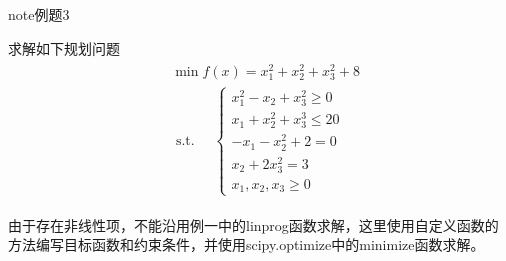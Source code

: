 \documentclass[letterpaper,10pt,english]{sphinxmanual}
\begin{document}
\begin{sphinxadmonition}{note}{例题3}

求解如下规划问题
\begin{equation*}
\begin{split}
\begin{array}{l}
&{\min f(x)=x_{1}^{2}+x_{2}^{2}+x_{3}^{2}+8} \\
&\text { s.t. }{\quad\left\{\begin{array}{l}{x_{1}^{2}-x_{2}+x_{3}^{2} \geq 0} \\ {x_{1}+x_{2}^{2}+x_{3}^{3} \leq 20} \\ {-x_{1}-x_{2}^{2}+2=0}\\
 {x_{2}+2 x_{3}^{2}=3}\\
 {x_{1}, x_{2}, x_{3} \geq 0}
\end{array}\right.}\end{array}
\end{split}
\end{equation*}\end{sphinxadmonition}

由于存在非线性项，不能沿用例一中的linprog函数求解，这里使用自定义函数的方法编写目标函数和约束条件，并使用scipy.optimize中的minimize函数求解。


\begin{sphinxVerbatim}[commandchars=\\\{\}]
   
   
\end{sphinxVerbatim}

\end{document}
